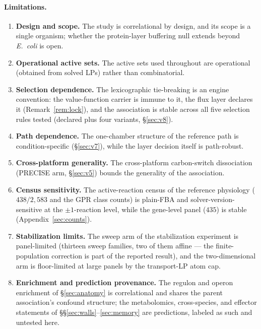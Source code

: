 \documentclass[11pt,a4paper]{article}
\theoremstyle{plain}
\theoremstyle{definition}
\theoremstyle{remark}
\begin{document}
\paragraph{Limitations.}
\begin{enumerate}[label=\textbf{\arabic*.},leftmargin=2.2em,itemsep=2pt]
\item \textbf{Design and scope.} The study is correlational by
      design, and its scope is a single organism; whether the
      protein-layer buffering null extends beyond \emph{E.~coli} is
      open.
\item \textbf{Operational active sets.} The active sets used
      throughout are operational (obtained from solved LPs) rather
      than combinatorial.
\item \textbf{Selection dependence.} The lexicographic tie-breaking
      is an engine convention: the value-function carrier is immune
      to it, the flux layer declares it (Remark~\ref{rem:lock}), and
      the association is stable across all five selection rules
      tested (declared plus four variants, \S\ref{sec:v8}).
\item \textbf{Path dependence.} The one-chamber structure of the
      reference path is condition-specific (\S\ref{sec:v7}), while
      the layer decision itself is path-robust.
\item \textbf{Cross-platform generality.} The cross-platform
      carbon-switch dissociation (PRECISE arm, \S\ref{sec:v5})
      bounds the generality of the association.
\item \textbf{Census sensitivity.} The active-reaction census of the
      reference physiology ($438/2{,}583$
      and the GPR class counts) is plain-FBA and solver-version-sensitive
      at the $\pm 1$-reaction level, while the gene-level panel ($435$) is
      stable (Appendix~\ref{sec:counts}).
\item \textbf{Stabilization limits.} The sweep arm of the
      stabilization experiment is panel-limited (thirteen sweep
      families, two of them affine --- the finite-population
      correction is part of the reported result), and the
      two-dimensional arm is floor-limited at large panels by the
      transport-LP atom cap.
\item \textbf{Enrichment and prediction provenance.} The regulon and
      operon enrichment of \S\ref{sec:anatomy} is correlational and
      shares the parent association's confound structure; the
      metabolomics, cross-species, and effector statements of
      \S\S\ref{sec:walls}--\ref{sec:memory} are predictions, labeled
      as such and untested here.
\end{enumerate}
\end{document}
